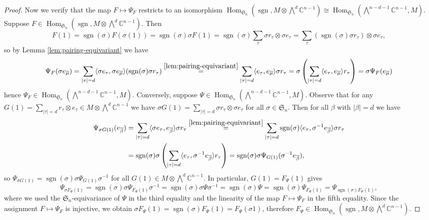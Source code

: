 \documentclass[11pt, reqno]{amsart}
\theoremstyle{definition}
\theoremstyle{remark}
\numberwithin{equation}{section}
\newcommand{\0}{\emptyset}
\newcommand{\C}{\mathbb{C}}
\renewcommand{\S}{\mathfrak{S}}
\DeclareMathOperator{\sgn}{sgn}
\DeclareMathOperator{\Hom}{Hom}
\begin{document}
\begin{proof}
    Now we verify that the map $F \mapsto \Psi_F$ restricts to an isomorphism 
    $\Hom_{\S_n}\left(\sgn, M \otimes \bigwedge\nolimits^d \C^{n-1}\right) \cong 
    \Hom_{\S_n}\left(\bigwedge\nolimits^{n-d-1} \C^{n-1}, M\right)$. 
    Suppose $F \in \Hom_{\S_n}\left( \sgn, M \otimes \bigwedge\nolimits^d \C^{n-1}\right)$. 
    Then 
    \[
        F(1) 
        = \sgn(\sigma) F(\sigma(1)) 
        = \sgn(\sigma) \sigma F(1) 
        = \sgn(\sigma)\sum_{\tau} \sigma r_\tau \otimes \sigma e_\tau 
        = \sum_{\tau} (\sgn(\sigma) \sigma r_\tau) \otimes \sigma e_\tau, 
    \]
    so by Lemma \ref{lem:pairing-equivariant} we have 
    \[
        \Psi_F(\sigma e_{\overline{\mu}}) 
        = \sum_{|\tau| = d} \langle \sigma e_\tau, \sigma e_{\overline{\mu}} \rangle (\sgn(\sigma) \sigma r_\tau) 
        \overset{\ref{lem:pairing-equivariant}}{=} 
        \sum_{|\tau| = d} \langle e_\tau, e_{\overline{\mu}} \rangle \sigma r_\tau 
        = \sigma \left( \sum_{|\tau| = d} \langle e_\tau, e_{\overline{\mu}} \rangle r_\tau \right)
        = \sigma \Psi_F(e_{\overline{\mu}}) 
    \]
    hence $\Psi_F \in \Hom_{\S_n}\left( \bigwedge\nolimits^{n-d-1} \C^{n-1}, M\right)$. 
    Conversely, suppose $\Psi \in \Hom_{\S_n}\left(\bigwedge\nolimits^{n-d-1}\C^{n-1}, M\right)$. 
    Observe that for any 
    $G(1) = \sum_{|\tau|=d} r_\tau \otimes e_\tau \in M \otimes \bigwedge\nolimits^d\C^{n-1}$ we 
    have $\sigma G(1) = \sum_{|\tau|=d} \sigma r_\tau \otimes \sigma e_\tau$ for all $\sigma \in \S_n$. 
    Then for all $\beta$ with $|\beta|=d$ we have 
    \begin{align*}
        \Psi_{\sigma G(1)}(e_{\overline{\beta}}) 
        &= \sum_{|\tau| = d} \langle \sigma e_\tau, e_{\overline{\beta}} \rangle \sigma r_\tau 
        \overset{\ref{lem:pairing-equivariant}}{=} 
        \sum_{|\tau| = d} \sgn(\sigma) \langle e_\tau, \sigma^{-1} e_{\overline{\beta}} \rangle \sigma r_\tau \\
        &= \sgn(\sigma) \sigma \left(\sum_{|\tau| = d} 
        \langle e_\tau, \sigma^{-1} e_{\overline{\beta}} \rangle r_\tau \right) 
        = \sgn(\sigma) \sigma \Psi_{G(1)}( \sigma^{-1} e_{\overline{\beta}}), 
    \end{align*}
    so $\Psi_{\sigma G(1)} = \sgn(\sigma) \sigma \Psi_{G(1)} \sigma^{-1}$ 
    for all $G(1) \in M \otimes \bigwedge\nolimits^d \C^{n-1}$. 
    In particular, $G(1) = F_{\Psi}(1)$ gives 
    \[
        \Psi_{\sigma F_\Psi(1)} = 
        \sgn(\sigma) \sigma \Psi_{F_\Psi(1)}\sigma^{-1} = 
        \sgn(\sigma) \sigma \Psi \sigma^{-1} = 
        \sgn(\sigma) \Psi = 
        \sgn(\sigma) \Psi_{F_\Psi(1)} = 
        \Psi_{\sgn(\sigma) F_\Psi(1)}, 
    \]
    where we used the $\S_n$-equivariance of $\Psi$ in the third equality 
    and the linearity of the map $F \mapsto \Psi_F$ in the fifth equality. 
    Since the assignment $F \mapsto \Psi_F$ is injective, 
    we obtain $\sigma F_\Psi(1) = \sgn(\sigma) F_\Psi(1) = F_\Psi(\sigma 1)$, 
    therefore $F_{\Psi} \in \Hom_{\S_n}\left( \sgn, M \otimes \bigwedge\nolimits^d \C^{n-1}\right)$. 
\end{proof}
\end{document}
